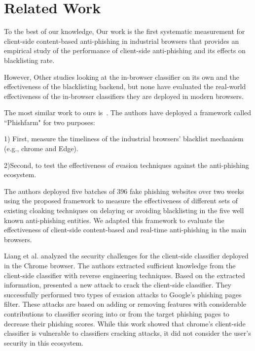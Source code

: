 
\section{Related Work}
\label{s:related}

To the best of our knowledge, Our work is the first systematic measurement for client-side content-based anti-phishing in industrial browsers that provides an empirical study of the performance of client-side anti-phishing and its effects on blacklisting rate. 

However, Other studies looking at the in-browser classifier on its own and the effectiveness of the blacklisting backend, but none have evaluated the real-world effectiveness of the in-browser classifiers they are deployed in modern browsers.

The most similar work to ours is~\cite{oest2019phishfarm}. The authors have deployed a framework called ``Phishfarm" for two purposes: 

1) First, measure the timeliness of the industrial browsers' blacklist mechanism (e.g., chrome and Edge). 

2)Second, to test the effectiveness of evasion techniques against the anti-phishing ecosystem.

The authors deployed five batches of 396 fake phishing websites over two weeks using the proposed framework to measure the effectiveness of different sets of existing cloaking techniques on delaying or avoiding blacklisting in the five well known anti-phishing entities.
We adapted this framework to evaluate the effectiveness of client-side content-based and real-time anti-phishing in the main browsers.

Liang et al.\cite{liang2016cracking} analyzed the security challenges for the client-side classifier deployed in the Chrome browser. 
The authors extracted sufficient knowledge from the client-side classifier with reverse engineering techniques. Based on the extracted information, presented a new attack to crack the client-side classifier. They successfully performed two types of evasion attacks to Google's phishing pages filter. These attacks are based on adding or removing features with considerable contributions to classifier scoring into or from the target phishing pages to decrease their phishing scores.
While this work showed that chrome's client-side classifier is vulnerable to classifiers cracking attacks, it did not consider the user's security in this ecosystem.

